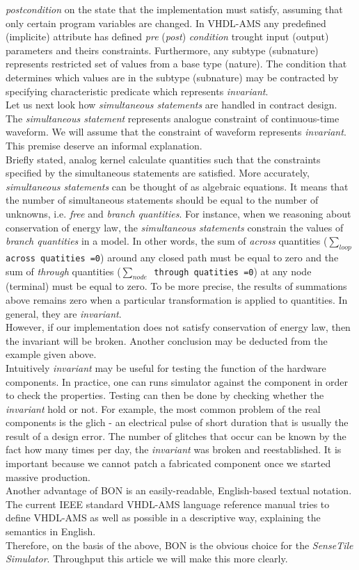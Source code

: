 \documentclass{article}
\newcommand{\STS}{\emph{SenseTile Simulator}\xspace}
\newcommand{\inv}{\emph{invariant}\xspace}
\newcommand{\arcoss}{\emph{across}\xspace}
\newcommand{\through}{\emph{through}\xspace}
\begin{document}
\emph{postcondition} on the state that the implementation must satisfy, assuming that
only certain program variables are changed.
In VHDL-AMS any predefined (implicite) attribute 
has defined \emph{pre} (\emph{post}) \emph{condition} trought input (output)
parameters and theirs constraints. Furthermore, any subtype (subnature)
represents restricted set of values from a base type (nature).
The condition that determines which values are in the subtype (subnature) 
may be contracted by specifying characteristic predicate which represents \inv.\\
Let us next look how \emph{simultaneous statements} are handled in contract design.
The \emph{simultaneous statement} represents analogue constraint of
continuous-time waveform. We will assume that the constraint of waveform
represents \inv. This premise deserve an informal explanation.\\
Briefly stated, analog kernel calculate quantities such
that the constraints specified by the simultaneous statements are satisfied.
More accurately, \emph{simultaneous statements} can be thought of as
algebraic equations. It means that the number of simultaneous statements
should be equal to the number of unknowns, i.e. \emph{free} and \emph{branch}
\emph{quantities}. For instance, when we reasoning about conservation of energy law,
the \emph{simultaneous statements} constrain the values of \emph{branch quantities}
in a model.
In other words, the sum of \arcoss quantities (\texttt{$\sum_{loop}$ across quatities =0})
around any closed path must be equal to zero and the sum of \through
quantities (\texttt{$\sum_{node}$ through quatities =0}) at any node
(terminal) must be equal to zero. To be more precise, the results of summations 
above remains zero when a particular transformation is applied to quantities.
In general, they are \inv. \\
However, if our implementation does not satisfy conservation of energy law, 
 then the invariant will be broken. 
Another conclusion may be deducted from the example given above.\\
Intuitively \inv may be useful for testing the function of the hardware components.
In practice, one can runs simulator against the component in order to check 
the properties. Testing can then be done by checking whether the \inv hold or not.
For example, the most common problem of the real components is the glich - an electrical pulse 
of short duration that is usually the result of a design error.
The number of glitches that occur can be known by the fact how many times per day, 
the \inv was broken and reestablished. 
It is important because we cannot patch a fabricated component once we started
massive production. \\
Another advantage of BON is an easily-readable, English-based textual notation.
The current IEEE standard VHDL-AMS language reference manual tries to define
VHDL-AMS as well as possible in a descriptive way, explaining the
semantics in English.\\
Therefore, on the basis of the above, BON is the obvious choice
for the \STS.
Throughput this article we will make this more clearly. 
\end{document}

